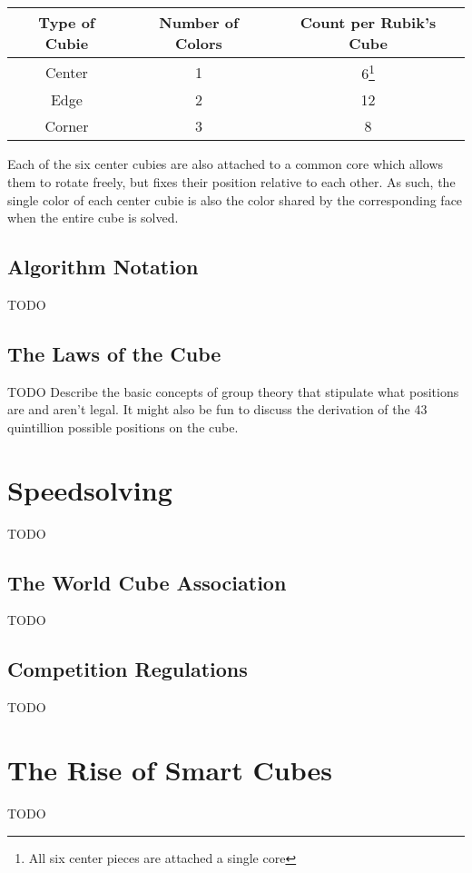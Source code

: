\begin{center}
    \begin{minipage}{10cm}
        \begin{tabular}{ | c | c | c | }
            \hline
            Type of Cubie & Number of Colors & Count per Rubik's Cube \\ 
            \hline \hline
            Center & 1 & 6\footnote[1]{All six center pieces are attached a single core} \\
            \hline
            Edge & 2 & 12 \\  
            \hline
            Corner & 3 & 8 \\
            \hline
        \end{tabular}
    \end{minipage}
\end{center}

Each of the six center cubies are also attached to a common core which allows them to rotate freely, but fixes their position relative to each other.
As such, the single color of each center cubie is also the color shared by the corresponding face when the entire cube is solved.

\subsection{Algorithm Notation}
TODO

\subsection{The Laws of the Cube}
TODO Describe the basic concepts of group theory that stipulate what positions are and aren't legal. It might also be fun to discuss the derivation of the 43 quintillion possible positions on the cube.


\section{Speedsolving}

TODO

\subsection{The World Cube Association}
TODO

\subsection{Competition Regulations}
TODO


\section{The Rise of Smart Cubes}

TODO